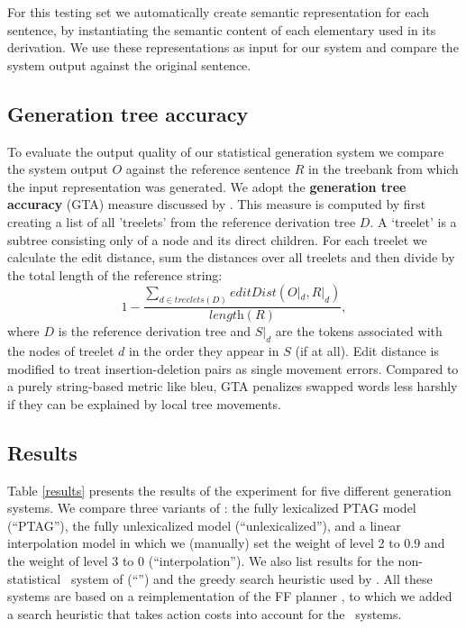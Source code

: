 For this testing set we automatically create semantic representation for each sentence, by instantiating the semantic content of each elementary used in its derivation. We use these representations as input for our system and compare the system output against the original sentence.


\subsection{Generation tree accuracy}
\label{ssec:eval-measures}
To evaluate the output quality of our statistical generation system we compare the system output $O$ against the reference sentence $R$ in the treebank from which the input representation was generated. We adopt the {\bf generation tree accuracy} (GTA) measure discussed by \cite{bangalorerambowwhittaker2001}.
This measure is computed by first creating a list of all 'treelets' from the reference derivation tree $D$. A `treelet' is a subtree consisting only of a node and its direct children. For each treelet we calculate the edit distance, sum the distances over all treelets and then divide by the total length of the reference string:
$$1 - \frac{\sum\limits_{d \in treelets(D)} editDist(O|_d, R|_d)}{\textit{length}(R)},$$
where $D$ is the reference derivation tree and $S|_d$ are the tokens associated with the nodes of treelet $d$ in the order they appear in $S$ (if at all).  Edit distance is modified to treat insertion-deletion pairs as single movement errors.  Compared to a purely string-based metric like {\sc bleu}, GTA penalizes swapped words less harshly if they can be explained by local tree movements.


\subsection{Results}

Table \ref{results} presents the results of the experiment for five different generation systems.  We compare three variants of \pcrisp: the fully lexicalized PTAG model (``PTAG''), the fully unlexicalized model (``unlexicalized''), and a linear interpolation model in which we (manually) set the weight of level 2 to 0.9  and the weight of level 3 to 0 (``interpolation'').  We also list results for the non-statistical \crisp\ system of   (``\crisp'') and the greedy search heuristic used by \spud.  All these systems are based on a reimplementation of the FF planner \cite{hoffmannnebel2001}, to which we added a search heuristic that takes action costs into account for the \pcrisp\ systems.

